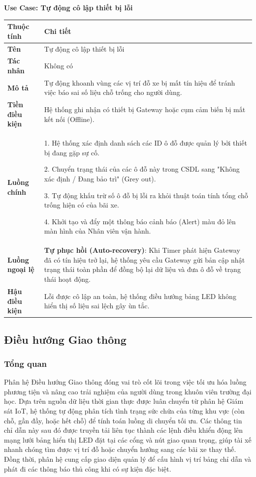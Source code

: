 \noindent \textbf{Use Case: Tự động cô lập thiết bị lỗi} \\
\renewcommand{\arraystretch}{1.6}
\begin{xltabular}{\textwidth}{|l|X|}
\hline
\textbf{Thuộc tính} & \textbf{Chi tiết} \\
\hline
\textbf{Tên} & Tự động cô lập thiết bị lỗi  \\
\hline
\textbf{Tác nhân} & Không có \\
\hline
\textbf{Mô tả} & Tự động khoanh vùng các vị trí đỗ xe bị mất tín hiệu để tránh việc báo sai số liệu chỗ trống cho người dùng. \\
\hline
\textbf{Tiền điều kiện} & Hệ thống ghi nhận có thiết bị Gateway hoặc cụm cảm biến bị mất kết nối (Offline). \\
\hline
\textbf{Luồng chính} & 
1. Hệ thống xác định danh sách các ID ô đỗ được quản lý bởi thiết bị đang gặp sự cố.

2. Chuyển trạng thái của các ô đỗ này trong CSDL sang "Không xác định / Đang bảo trì" (Grey out).

3. Tự động khấu trừ số ô đỗ bị lỗi ra khỏi thuật toán tính tổng chỗ trống hiện có của bãi xe.

4. Khởi tạo và đẩy một thông báo cảnh báo (Alert) màu đỏ lên màn hình của Nhân viên vận hành.\\
\hline

\textbf{Luồng ngoại lệ} & 
\textbf{Tự phục hồi (Auto-recovery)}: Khi Timer phát hiện Gateway đã có tín hiệu trở lại, hệ thống yêu cầu Gateway gửi bản cập nhật trạng thái toàn phần để đồng bộ lại dữ liệu và đưa ô đỗ về trạng thái hoạt động.\\
\hline

\textbf{Hậu điều kiện} & Lỗi được cô lập an toàn, hệ thống điều hướng bảng LED không hiển thị số liệu sai lệch gây ùn tắc. \\
\hline
\end{xltabular}

\newpage
\subsection{Điều hướng Giao thông}
\subsubsection{Tổng quan}
Phân hệ Điều hướng Giao thông đóng vai trò cốt lõi trong việc tối ưu hóa luồng phương tiện và nâng cao trải nghiệm của người dùng trong khuôn viên trường đại học. Dựa trên nguồn dữ liệu thời gian thực được luân chuyển từ phân hệ Giám sát IoT, hệ thống tự động phân tích tình trạng sức chứa của từng khu vực (còn chỗ, gần đầy, hoặc hết chỗ) để tính toán luồng di chuyển tối ưu. Các thông tin chỉ dẫn này sau đó được truyền tải liên tục thành các lệnh điều khiển động lên mạng lưới bảng hiển thị LED đặt tại các cổng và nút giao quan trọng, giúp tài xế nhanh chóng tìm được vị trí đỗ hoặc chuyển hướng sang các bãi xe thay thế. Đồng thời, phân hệ cung cấp giao diện quản lý để cấu hình vị trí bảng chỉ dẫn và phát đi các thông báo thủ công khi có sự kiện đặc biệt.

